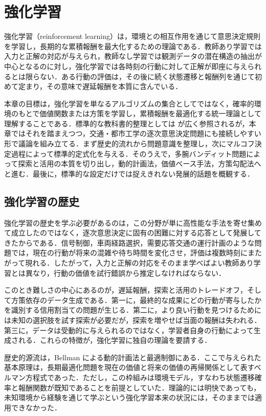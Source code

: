 \section{強化学習}

強化学習（reinforcement learning）は，環境との相互作用を通じて意思決定規則を学習し，長期的な累積報酬を最大化するための理論である．教師あり学習では入力と正解の対応が与えられ，教師なし学習では観測データの潜在構造の抽出が中心となるのに対し，強化学習では各時刻の行動に対して正解が即座に与えられるとは限らない．ある行動の評価は，その後に続く状態遷移と報酬列を通じて初めて定まり，その意味で遅延報酬を本質に含んでいる．

本章の目標は，強化学習を単なるアルゴリズムの集合としてではなく，確率的環境のもとで価値関数または方策を学習し，累積報酬を最適化する統一理論として理解することである．標準的な教科書的整理としては \citet{SuttonBarto2018} が広く参照されるが，本章ではそれを踏まえつつ，交通・都市工学の逐次意思決定問題にも接続しやすい形で議論を組み立てる．まず歴史的流れから問題意識を整理し，次にマルコフ決定過程によって標準的定式化を与える．そのうえで，多腕バンディット問題によって探索と活用の本質を切り出し，動的計画法，価値ベース手法，方策勾配法へと進む．最後に，標準的な設定だけでは捉えきれない発展的話題を概観する．

\subsection{強化学習の歴史}

強化学習の歴史を学ぶ必要があるのは，この分野が単に高性能な手法を寄せ集めて成立したのではなく，逐次意思決定に固有の困難に対する応答として発展してきたからである．信号制御，車両経路選択，需要応答交通の運行計画のような問題では，現在の行動が将来の混雑や待ち時間を変化させ，評価は複数時刻にまたがって現れる．したがって，入力と正解の対応をそのまま学べばよい教師あり学習とは異なり，行動の価値を試行錯誤から推定しなければならない．

このとき難しさの中心にあるのが，遅延報酬，探索と活用のトレードオフ，そして方策依存のデータ生成である．第一に，最終的な成果にどの行動が寄与したかを識別する信用割当ての問題が生じる．第二に，より良い行動を見つけるためには未知の選択肢を試す探索が必要だが，探索を増やせば当面の報酬は失われる．第三に，データは受動的に与えられるのではなく，学習者自身の行動によって生成される．これらの特徴が，強化学習に独自の理論を要請する．

歴史的源流は，Bellman による動的計画法と最適制御にある\cite{Bellman1957,Puterman1994}．ここで与えられた基本原理は，長期最適化問題を現在の価値と将来の価値の再帰関係として表すベルマン方程式であった．ただし，この枠組みは環境モデル，すなわち状態遷移確率と報酬関数が既知であることを前提としていた．理論的には明快であっても，未知環境から経験を通じて学ぶという強化学習本来の状況には，そのままでは適用できなかった．

